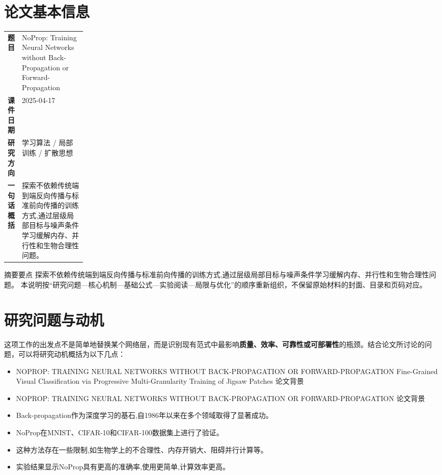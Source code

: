 \documentclass[UTF8,11pt,a4paper]{ctexart}
\newcommand{\term}[1]{\textbf{\textcolor{mainblue}{#1}}}
\begin{document}
\section{论文基本信息}
\begin{center}
\begin{tabularx}{0.94\linewidth}{>{\bfseries}p{0.18\linewidth}X}
\toprule
题目 & NoProp: Training Neural Networks without Back-Propagation or Forward-Propagation\\
课件日期 & 2025-04-17\\
研究方向 & 学习算法 / 局部训练 / 扩散思想\\
一句话概括 & 探索不依赖传统端到端反向传播与标准前向传播的训练方式,通过层级局部目标与噪声条件学习缓解内存、并行性和生物合理性问题。\\
\bottomrule
\end{tabularx}
\end{center}

\begin{infobox}{摘要要点}
探索不依赖传统端到端反向传播与标准前向传播的训练方式,通过层级局部目标与噪声条件学习缓解内存、并行性和生物合理性问题。 本说明按“研究问题—核心机制—基础公式—实验阅读—局限与优化”的顺序重新组织，不保留原始材料的封面、目录和页码对应。
\end{infobox}

\section{研究问题与动机}
这项工作的出发点不是简单地替换某个网络层，而是识别现有范式中最影响\term{质量、效率、可靠性或可部署性}的瓶颈。结合论文所讨论的问题，可以将研究动机概括为以下几点：
\begin{itemize}
\item NOPROP: TRAINING NEURAL NETWORKS WITHOUT BACK-PROPAGATION OR FORWARD-PROPAGATION Fine-Grained Visual Classification via Progressive Multi-Granularity Training of Jigsaw Patches 论文背景
\item NOPROP: TRAINING NEURAL NETWORKS WITHOUT BACK-PROPAGATION OR FORWARD-PROPAGATION 论文背景
\item Back-propagation作为深度学习的基石,自1986年以来在多个领域取得了显著成功。
\item NoProp在MNIST、CIFAR-10和CIFAR-100数据集上进行了验证。
\item 这种方法存在一些限制,如生物学上的不合理性、内存开销大、阻碍并行计算等。
\item 实验结果显示NoProp具有更高的准确率,使用更简单,计算效率更高。
\end{itemize}
\end{document}
